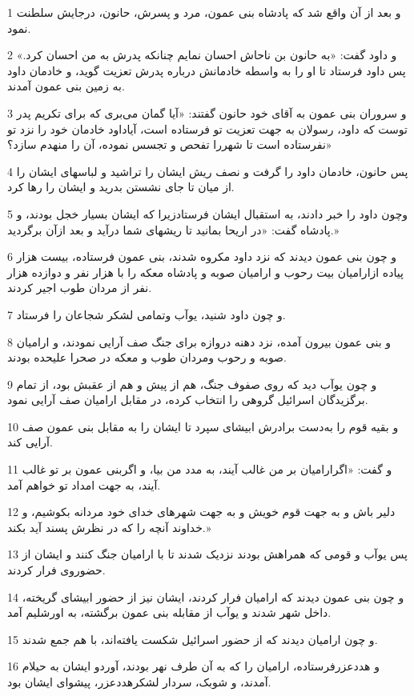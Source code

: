 \par 1 و بعد از آن واقع شد که پادشاه بنی عمون، مرد و پسرش، حانون، درجایش سلطنت نمود.
\par 2 و داود گفت: «به حانون بن ناحاش احسان نمایم چنانکه پدرش به من احسان کرد.» پس داود فرستاد تا او را به واسطه خادمانش درباره پدرش تعزیت گوید، و خادمان داود به زمین بنی عمون آمدند.
\par 3 و سروران بنی عمون به آقای خود حانون گفتند: «آیا گمان می‌بری که برای تکریم پدر توست که داود، رسولان به جهت تعزیت تو فرستاده است، آیاداود خادمان خود را نزد تو نفرستاده است تا شهررا تفحص و تجسس نموده، آن را منهدم سازد؟»
\par 4 پس حانون، خادمان داود را گرفت و نصف ریش ایشان را تراشید و لباسهای ایشان را از میان تا جای نشستن بدرید و ایشان را رها کرد.
\par 5 وچون داود را خبر دادند، به استقبال ایشان فرستادزیرا که ایشان بسیار خجل بودند، و پادشاه گفت: «در اریحا بمانید تا ریشهای شما درآید و بعد ازآن برگردید.»
\par 6 و چون بنی عمون دیدند که نزد داود مکروه شدند، بنی عمون فرستاده، بیست هزار پیاده ازارامیان بیت رحوب و ارامیان صوبه و پادشاه معکه را با هزار نفر و دوازده هزار نفر از مردان طوب اجیر کردند.
\par 7 و چون داود شنید، یوآب وتمامی لشکر شجاعان را فرستاد.
\par 8 و بنی عمون بیرون آمده، نزد دهنه دروازه برای جنگ صف آرایی نمودند، و ارامیان صوبه و رحوب ومردان طوب و معکه در صحرا علیحده بودند.
\par 9 و چون یوآب دید که روی صفوف جنگ، هم از پیش و هم از عقبش بود، از تمام برگزیدگان اسرائیل گروهی را انتخاب کرده، در مقابل ارامیان صف آرایی نمود.
\par 10 و بقیه قوم را به‌دست برادرش ابیشای سپرد تا ایشان را به مقابل بنی عمون صف آرایی کند.
\par 11 و گفت: «اگرارامیان بر من غالب آیند، به مدد من بیا، و اگربنی عمون بر تو غالب آیند، به جهت امداد تو خواهم آمد.
\par 12 دلیر باش و به جهت قوم خویش و به جهت شهرهای خدای خود مردانه بکوشیم، و خداوند آنچه را که در نظرش پسند آید بکند.»
\par 13 پس یوآب و قومی که همراهش بودند نزدیک شدند تا با ارامیان جنگ کنند و ایشان از حضوروی فرار کردند.
\par 14 و چون بنی عمون دیدند که ارامیان فرار کردند، ایشان نیز از حضور ابیشای گریخته، داخل شهر شدند و یوآب از مقابله بنی عمون برگشته، به اورشلیم آمد.
\par 15 و چون ارامیان دیدند که از حضور اسرائیل شکست یافته‌اند، با هم جمع شدند.
\par 16 و هددعزرفرستاده، ارامیان را که به آن طرف نهر بودند، آوردو ایشان به حیلام آمدند، و شوبک، سردار لشکرهددعزر، پیشوای ایشان بود.
